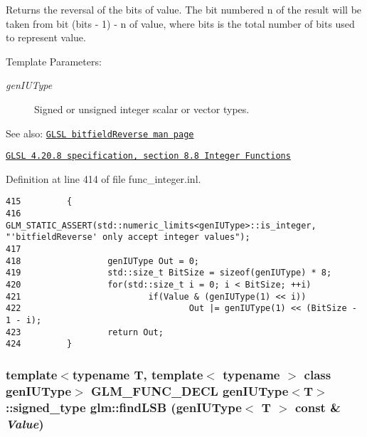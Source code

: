 Returns the reversal of the bits of value. The bit numbered n of the result will be taken from bit (bits - 1) - n of value, where bits is the total number of bits used to represent value.

\begin{Desc}
\item[Template Parameters:]
\begin{description}
\item[{\em genIUType}]Signed or unsigned integer scalar or vector types.\end{description}
\end{Desc}
\begin{Desc}
\item[See also:]\href{http://www.opengl.org/sdk/docs/manglsl/xhtml/bitfieldReverse.xml}{\tt GLSL bitfieldReverse man page} 

\href{http://www.opengl.org/registry/doc/GLSLangSpec.4.20.8.pdf}{\tt GLSL 4.20.8 specification, section 8.8 Integer Functions} \end{Desc}


Definition at line 414 of file func\_\-integer.inl.

\begin{Code}\begin{verbatim}415         {
416                 GLM_STATIC_ASSERT(std::numeric_limits<genIUType>::is_integer, "'bitfieldReverse' only accept integer values");
417 
418                 genIUType Out = 0;
419                 std::size_t BitSize = sizeof(genIUType) * 8;
420                 for(std::size_t i = 0; i < BitSize; ++i)
421                         if(Value & (genIUType(1) << i))
422                                 Out |= genIUType(1) << (BitSize - 1 - i);
423                 return Out;
424         }       
\end{verbatim}
\end{Code}


\hypertarget{group__core__func__integer_gdda1c11511dea60cd3f0b414d8baa9c2}{
\subsubsection[findLSB]{\setlength{\rightskip}{0pt plus 5cm}template$<$typename T, template$<$ typename $>$ class genIUType$>$ GLM\_\-FUNC\_\-DECL genIUType$<$T$>$::signed\_\-type glm::findLSB (genIUType$<$ T $>$ const \& {\em Value})}}
\label{group__core__func__integer_gdda1c11511dea60cd3f0b414d8baa9c2}


